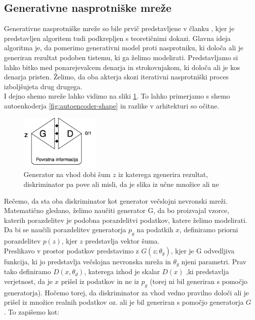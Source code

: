 \documentclass[12pt,a4paper,twoside]{article}
\theoremstyle{definition} %
\theoremstyle{plain} %
\numberwithin{equation}{section}  %
\begin{document}
\subsection{Generativne nasprotniške mreže}
Generativne nasprotniške mreže so bile prvič predstavljene v članku  \cite{gangoodfellow}, kjer je predstavljen algoritem tudi podkrepljen s teoretičnimi
dokazi. Glavna ideja algoritma je, da pomerimo generativni model proti nasprotniku, ki določa ali je generiran rezultat podoben tistemu, ki ga želimo modelirati. 
Predstavljamo si lahko bitko med ponarejevalcem denarja in strokovnjakom, ki določa ali je kos denarja pristen. Želimo, da oba akterja skozi iterativni nasprotniški proces izboljšujeta drug drugega. \\ I
dejno shemo  mreže lahko vidimo na sliki \ref{fig:gan-diagram}. To lahko primerjamo s shemo autoenkoderja  \ref{fig:autoencoder-shape} in razlike v arhitekturi so očitne. 
\begin{figure}[ht]
  \centering
  \includegraphics[width=0.35\textwidth]{images/gan_schema.png}
 \caption[Diagram strukture autoenkoderja ]{Generator na vhod dobi šum $z$ iz katerega zgenerira rezultat, diskriminator pa pove ali misli, da je slika iz učne množice ali ne}
  \label{fig:gan-diagram}
\end{figure}


Rečemo, da sta oba  diskriminator kot generator večslojni nevronski mreži. Matematično gledano, želimo naučiti generator G, da bo proizvajal vzorce, katerih porazdelitev je podobna porazdelitvi podatkov, katere želimo modelirati. Da bi se naučili porazdelitev generatorja $p_g$ na podatkih $x$, definiramo priorni porazdelitev $p(z)$, kjer $z$ predstavlja vektor šuma.\\ Preslikavo v prostor podatkov predstavimo z $G(z;\theta_g)$, kjer je G odvedljiva funkcija, ki jo predstavlja večslojna nevronska mreža in $\theta_g$ njeni parametri.  Prav tako definiramo $D(x,\theta_d)$, katerega izhod je skalar $D(x)$ ,ki predstavlja verjetnost, da je $x$ prišel iz podatkov in ne iz  $p_g$ (torej ni bil generiran s pomočjo generatorja). Hočemo torej, da diskriminator za vhod vedno pravilno določi ali je prišel iz množice realnih podatkov oz. ali je bil generiran s pomočjo generatorja $G$. To zapišemo kot: 
\end{document}
